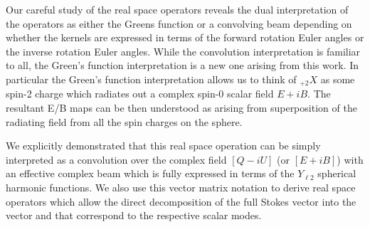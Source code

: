 Our careful study of the real space operators reveals the dual interpretation of the operators as either the Greens function or a convolving beam depending on whether the kernels are expressed in terms of the forward rotation Euler angles or the inverse rotation Euler angles. While the convolution interpretation is familiar to all, the Green's function interpretation is a new one arising from this work. In particular the Green's function interpretation allows us to think of ${}_{+2}X$ as some spin-2 charge which radiates out a complex spin-0 scalar field $E+iB$. The resultant E/B maps can be then understood as arising from superposition of the radiating field from all the spin charges on the sphere.

 We explicitly demonstrated that this real space operation can be simply interpreted as a convolution over the complex field $[Q - i U]$ (or $[E + iB]$) with an effective complex beam which is fully expressed in terms of the $Y_{\ell 2}$ spherical harmonic functions. We also use this vector matrix notation to derive real space operators which allow the direct decomposition of the full Stokes vector \vp{} into the vector  and  that correspond to the respective scalar modes. 



